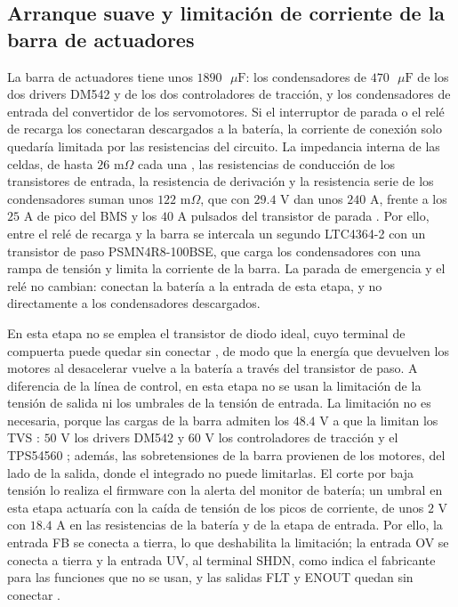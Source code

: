 \documentclass[../../General.tex]{subfiles}
\begin{document}

\subsection{Arranque suave y limitación de corriente de la barra de actuadores}\label{subsec:arranque_barra}

La barra de actuadores tiene unos $1890\text{ }\mu\text{F}$: los condensadores de $470\text{ }\mu\text{F}$ de los dos drivers DM542 y de los dos controladores de tracción, y los condensadores de entrada del convertidor de los servomotores. Si el interruptor de parada o el relé de recarga los conectaran descargados a la batería, la corriente de conexión solo quedaría limitada por las resistencias del circuito. La impedancia interna de las celdas, de hasta $26\text{ m}\Omega$ cada una \citep{samsung_30q}, las resistencias de conducción de los transistores de entrada, la resistencia de derivación y la resistencia serie de los condensadores suman unos $122\text{ m}\Omega$, que con $29.4\text{ V}$ dan unos $240\text{ A}$, frente a los $25\text{ A}$ de pico del BMS \citep{cmbatteries_7s3p} y los $40\text{ A}$ pulsados del transistor de parada \citep{vishay_sup40p10}. Por ello, entre el relé de recarga y la barra se intercala un segundo LTC4364-2 con un transistor de paso PSMN4R8-100BSE, que carga los condensadores con una rampa de tensión y limita la corriente de la barra. La parada de emergencia y el relé no cambian: conectan la batería a la entrada de esta etapa, y no directamente a los condensadores descargados.

En esta etapa no se emplea el transistor de diodo ideal, cuyo terminal de compuerta puede quedar sin conectar \citep{adi_ltc4364}, de modo que la energía que devuelven los motores al desacelerar vuelve a la batería a través del transistor de paso. A diferencia de la línea de control, en esta etapa no se usan la limitación de la tensión de salida ni los umbrales de la tensión de entrada. La limitación no es necesaria, porque las cargas de la barra admiten los $48.4\text{ V}$ a que la limitan los TVS \citep{vishay_smbj}: $50\text{ V}$ los drivers DM542 \citep{leadshine_dm542} y $60\text{ V}$ los controladores de tracción \citep{pololu_h2_36v11} y el TPS54560 \citep{ti_tps54560}; además, las sobretensiones de la barra provienen de los motores, del lado de la salida, donde el integrado no puede limitarlas. El corte por baja tensión lo realiza el firmware con la alerta del monitor de batería; un umbral en esta etapa actuaría con la caída de tensión de los picos de corriente, de unos $2\text{ V}$ con $18.4\text{ A}$ en las resistencias de la batería y de la etapa de entrada. Por ello, la entrada FB se conecta a tierra, lo que deshabilita la limitación; la entrada OV se conecta a tierra y la entrada UV, al terminal SHDN, como indica el fabricante para las funciones que no se usan, y las salidas FLT y ENOUT quedan sin conectar \citep{adi_ltc4364}.
\end{document}
